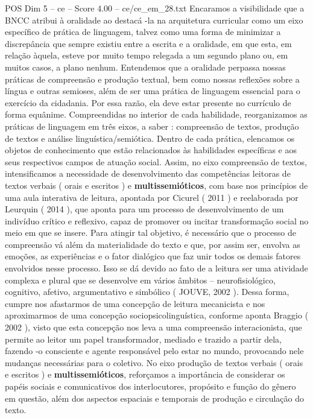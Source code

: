 \begin{textsample}{POS Dim 5 – ce – Score 4.00 – ce/ce\_em\_28.txt}
Encaramos a visibilidade que a BNCC atribui à oralidade ao destacá -la na arquitetura curricular como um eixo específico de prática de linguagem, talvez como uma forma de minimizar a discrepância que sempre existiu entre a escrita e a oralidade, em que esta, em relação àquela, esteve por muito tempo relegada a um segundo plano ou, em muitos casos, a plano nenhum.
Entendemos que a oralidade perpassa nossas práticas de compreensão e produção textual, bem como nossas reflexões sobre a língua e outras semioses, além de ser uma prática de linguagem essencial para o exercício da cidadania.
Por essa razão, ela deve estar presente no currículo de forma equânime.
Compreendidas no interior de cada habilidade, reorganizamos as práticas de linguagem em três eixos, a saber : compreensão de textos, produção de textos e análise linguística/semiótica.
Dentro de cada prática, elencamos os objetos de conhecimento que estão relacionados às habilidades específicas e aos seus respectivos campos de atuação social.
Assim, no eixo compreensão de textos, intensificamos a necessidade de desenvolvimento das competências leitoras de textos verbais ( orais e escritos ) e \textbf{multissemióticos}, com base nos princípios de uma aula interativa de leitura, apontada por Cicurel ( 2011 ) e reelaborada por Leurquin ( 2014 ), que aponta para um processo de desenvolvimento de um indivíduo crítico e reflexivo, capaz de promover ou incitar transformação social no meio em que se insere.
Para atingir tal objetivo, é necessário que o processo de compreensão vá além da materialidade do texto e que, por assim ser, envolva as emoções, as experiências e o fator dialógico que faz unir todos os demais fatores envolvidos nesse processo.
Isso se dá devido ao fato de a leitura ser uma atividade complexa e plural que se desenvolve em vários âmbitos – neurofisiológico, cognitivo, afetivo, argumentativo e simbólico ( JOUVE, 2002 ).
Dessa forma, cumpre nos afastarmos de uma concepção de leitura mecanicista e nos aproximarmos de uma concepção sociopsicolinguística, conforme aponta Braggio ( 2002 ), visto que esta concepção nos leva a uma compreensão interacionista, que permite ao leitor um papel transformador, mediado e trazido a partir dela, fazendo -o consciente e agente responsável pelo estar no mundo, provocando nele mudanças necessárias para o coletivo.
No eixo produção de textos verbais ( orais e escritos ) e \textbf{multissemióticos}, reforçamos a importância de considerar os papéis sociais e comunicativos dos interlocutores, propósito e função do gênero em questão, além dos aspectos espaciais e temporais de produção e circulação do texto.

\end{textsample}
